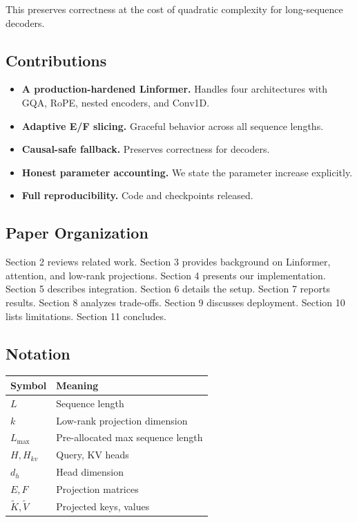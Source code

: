 This preserves correctness at the cost of quadratic complexity for 
long-sequence decoders.

\subsection{Contributions}

\begin{itemize}
\item \textbf{A production-hardened Linformer.} Handles four architectures with
  GQA, RoPE, nested encoders, and Conv1D.
\item \textbf{Adaptive E/F slicing.} Graceful behavior across all sequence lengths.
\item \textbf{Causal-safe fallback.} Preserves correctness for decoders.
\item \textbf{Honest parameter accounting.} We state the parameter increase
  explicitly.
\item \textbf{Full reproducibility.} Code and checkpoints released.

\end{itemize}
\subsection{Paper Organization}

Section 2 reviews related work. Section 3 provides background on Linformer, 
attention, and low-rank projections. Section 4 presents our implementation. 
Section 5 describes integration. Section 6 details the setup. Section 7 
reports results. Section 8 analyzes trade-offs. Section 9 discusses 
deployment. Section 10 lists limitations. Section 11 concludes.



\subsection{Notation}

\begin{table}[H]
\centering
\small
\begin{tabular}{ll}
\toprule
\textbf{Symbol} & \textbf{Meaning} \\
\midrule
$L$ & Sequence length \\
$k$ & Low-rank projection dimension \\
$L_\text{max}$ & Pre-allocated max sequence length \\
$H, H_{kv}$ & Query, KV heads \\
$d_h$ & Head dimension \\
$E, F$ & Projection matrices \\
$\tilde{K}, \tilde{V}$ & Projected keys, values \\
\bottomrule
\end{tabular}
\end{table}

